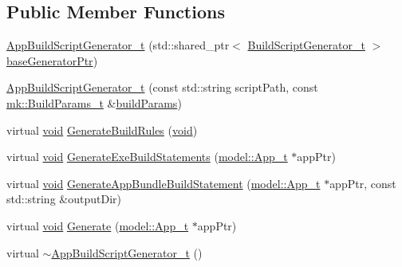 \subsection*{Public Member Functions}
\begin{DoxyCompactItemize}
\item 
\hyperlink{classninja_1_1_app_build_script_generator__t_ae3529b3201d0bf78a93ca611953ba58c}{App\+Build\+Script\+Generator\+\_\+t} (std\+::shared\+\_\+ptr$<$ \hyperlink{classninja_1_1_build_script_generator__t}{Build\+Script\+Generator\+\_\+t} $>$ \hyperlink{structninja_1_1_require_base_generator__t_a3a16080268acf0b71c18eed619429f6a}{base\+Generator\+Ptr})
\item 
\hyperlink{classninja_1_1_app_build_script_generator__t_adfc4c9d1e3395eb5589fb2b17cd28a2f}{App\+Build\+Script\+Generator\+\_\+t} (const std\+::string script\+Path, const \hyperlink{structmk_1_1_build_params__t}{mk\+::\+Build\+Params\+\_\+t} \&\hyperlink{structninja_1_1_require_base_generator__t_a78d7cecd653f49f8ad74fdbb65343705}{build\+Params})
\item 
virtual \hyperlink{_t_e_m_p_l_a_t_e__cdef_8h_ac9c84fa68bbad002983e35ce3663c686}{void} \hyperlink{classninja_1_1_app_build_script_generator__t_aa9e9fd08b42ad51ce9b73682c5c7b072}{Generate\+Build\+Rules} (\hyperlink{_t_e_m_p_l_a_t_e__cdef_8h_ac9c84fa68bbad002983e35ce3663c686}{void})
\item 
virtual \hyperlink{_t_e_m_p_l_a_t_e__cdef_8h_ac9c84fa68bbad002983e35ce3663c686}{void} \hyperlink{classninja_1_1_app_build_script_generator__t_a928b4f5147dbe54c3b8467f6f0870aeb}{Generate\+Exe\+Build\+Statements} (\hyperlink{structmodel_1_1_app__t}{model\+::\+App\+\_\+t} $\ast$app\+Ptr)
\item 
virtual \hyperlink{_t_e_m_p_l_a_t_e__cdef_8h_ac9c84fa68bbad002983e35ce3663c686}{void} \hyperlink{classninja_1_1_app_build_script_generator__t_a67c60611e3bddf9e5cbd5cf3ae0780d7}{Generate\+App\+Bundle\+Build\+Statement} (\hyperlink{structmodel_1_1_app__t}{model\+::\+App\+\_\+t} $\ast$app\+Ptr, const std\+::string \&output\+Dir)
\item 
virtual \hyperlink{_t_e_m_p_l_a_t_e__cdef_8h_ac9c84fa68bbad002983e35ce3663c686}{void} \hyperlink{classninja_1_1_app_build_script_generator__t_aeb7022c298c0401f7c183b0366675408}{Generate} (\hyperlink{structmodel_1_1_app__t}{model\+::\+App\+\_\+t} $\ast$app\+Ptr)
\item 
virtual \hyperlink{classninja_1_1_app_build_script_generator__t_a841487d1b1e2c0e0b27ea5556add5976}{$\sim$\+App\+Build\+Script\+Generator\+\_\+t} ()
\end{DoxyCompactItemize}
